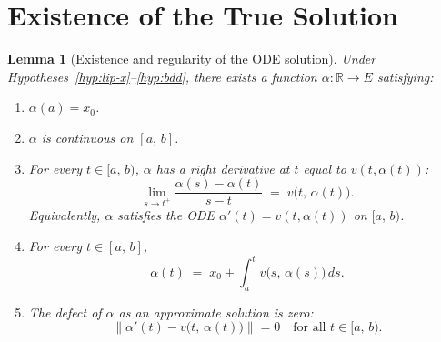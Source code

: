 \documentclass[11pt,a4paper]{article}
\newtheorem{lemma}[theorem]{Lemma}
\theoremstyle{definition}
\newcommand{\norm}[1]{\lVert #1 \rVert}
\newcommand{\R}{\mathbb{R}}
\newcommand{\Icc}[2]{[#1,\, #2]}
\newcommand{\Ico}[2]{[#1,\, #2)}
\begin{document}
\section{Existence of the True Solution}\label{sec:existence}

\begin{lemma}[Existence and regularity of the ODE solution]\label{lem:true-solution}
Under Hypotheses~\ref{hyp:lip-x}--\ref{hyp:bdd}, there exists
a function $\alpha \colon \R \to E$ satisfying:
\begin{enumerate}[label=(\roman*)]
  \item\label{it:init} $\alpha(a) = x_0$.
  \item\label{it:cont} $\alpha$ is continuous on $\Icc{a}{b}$.
  \item\label{it:deriv} For every $t \in \Ico{a}{b}$,
    $\alpha$ has a right derivative at $t$ equal to $v(t, \alpha(t))$:
    \[
      \lim_{s \to t^+} \frac{\alpha(s) - \alpha(t)}{s - t}
      \;=\; v\bigl(t,\, \alpha(t)\bigr).
    \]
    Equivalently, $\alpha$ satisfies the ODE
    $\alpha'(t) = v(t, \alpha(t))$ on $\Ico{a}{b}$.
  \item\label{it:integral} For every $t \in \Icc{a}{b}$,
    \begin{equation}\label{eq:integral-form}
      \alpha(t) \;=\; x_0 + \int_a^t v\bigl(s,\, \alpha(s)\bigr)\,ds.
    \end{equation}
  \item\label{it:exact-defect}
    The defect of $\alpha$ as an approximate solution is zero:
    \[
      \norm{\alpha'(t) - v\bigl(t,\, \alpha(t)\bigr)} = 0
      \quad \text{for all } t \in \Ico{a}{b}.
    \]
\end{enumerate}
\end{lemma}
\end{document}
